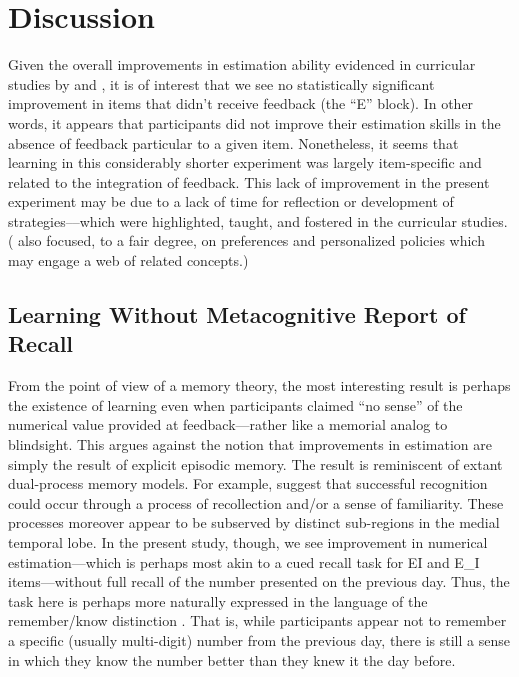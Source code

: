\section{Discussion}

Given the overall improvements in estimation ability evidenced in curricular
studies by \citeauthor{munnich_numerically-driven_2004} and
\citeauthor{ranney_designing_2008}, it is of interest that we see no statistically
significant improvement in items that didn't receive feedback (the ``E'' block).
In other words, it appears that participants did not improve their estimation
skills in the absence of feedback particular to a given item.
Nonetheless, it seems that learning in this considerably shorter experiment was
largely item-specific and related to the integration of feedback. This lack of
improvement in the present experiment may be due to a lack of time for
reflection or development of strategies––which were highlighted, taught, and
fostered in the curricular studies.
( also focused, to
a fair degree, on preferences and personalized policies which may engage a web
of related concepts.)

\subsection{Learning Without Metacognitive Report of Recall}

From the point of view of a memory theory, the most interesting result is
perhaps the existence of learning even when participants claimed “no sense” of
the numerical value provided at feedback---rather like a memorial analog to
blindsight. This argues against the notion that improvements in estimation are
simply the result of explicit episodic memory. The result is reminiscent of
extant dual-process memory models.  For example, \citeauthor{davachi_multiple_2003}
suggest that successful recognition could occur through a process of
recollection and/or a sense of familiarity.  These processes moreover appear to
be subserved by distinct sub-regions in the medial temporal lobe.  In the
present study, though, we see improvement in numerical estimation---which is
perhaps most akin to a cued recall task for EI and E\_I items---without full
recall of the number presented on the previous day.  Thus, the task here is
perhaps more naturally expressed in the language of the remember/know
distinction \citeauthor{knowlton_relationship_1998}.  That is, while participants
appear not to remember a specific (usually multi-digit) number from the previous
day, there is still a sense in which they know the number better than they knew
it the day before.

